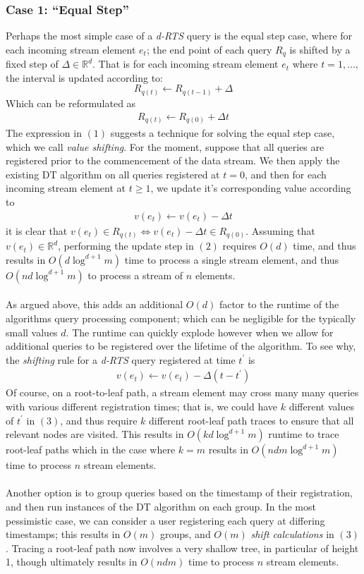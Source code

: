 \subsubsection*{Case 1: ``Equal Step''}
Perhaps the most simple case of a \textit{d-RTS} query is the equal step case, where for each incoming stream element $e_t$; the end point of each query $R_q$ is shifted by a fixed step of $\Delta\in\mathbb{R}^d$. That is for each incoming stream element $e_t$ where $t = 1,\dots,$ the interval is updated according to: 
$$R_{q(t)} \leftarrow R_{q(t-1)} + \Delta$$
Which can be reformulated as 
\begin{align}
    R_{q(t)} \leftarrow R_{q(0)} + \Delta t
\end{align}
The expression in $(1)$ suggests a technique for solving the equal step case, which we call \textit{value shifting}. For the moment, suppose that all queries are registered prior to the commencement of the data stream. We then apply the existing DT algorithm on all queries registered at $t=0$, and then for each incoming stream element at $t\geq1$, we update it's corresponding value according to 
\begin{align}
    v(e_t) \leftarrow v(e_t) - \Delta t
\end{align}
it is clear that $v(e_t) \in R_{q(t)} \iff v(e_t)-\Delta t \in R_{q(0)}$. Assuming that $v(e_t)\in\mathbb{R}^d$, performing the update step in $(2)$ requires $O(d)$ time, and thus results in $O(d\log^{d+1}m)$ time to process a single stream element, and thus $O(nd\log^{d+1}m)$ to process a stream of $n$ elements. \\
\\
As argued above, this adds an additional $O(d)$ factor to the runtime of the algorithms query processing component; which can be negligible for the typically small values $d$. The runtime can quickly explode however when we allow for additional queries to be registered over the lifetime of the algorithm. To see why, the \textit{shifting} rule for a \textit{d-RTS} query registered at time $t^\prime$ is
\begin{align}
    v(e_t) \leftarrow v(e_t) - \Delta(t - t^\prime)
\end{align}
Of course, on a root-to-leaf path, a stream element may cross many many queries with various different registration times; that is, we could have $k$ different values of $t^\prime$ in $(3)$, and thus require $k$ different root-leaf path traces to ensure that all relevant nodes are visited. This results in $O(kd\log^{d+1}m)$ runtime to trace root-leaf paths which in the case where $k=m$ results in $O(ndm\log^{d+1}m)$ time to process $n$ stream elements.\\
\\
Another option is to group queries based on the timestamp of their registration, and then run instances of the DT algorithm on each group. In the most pessimistic case, we can consider a user registering each query at differing timestamps; this results in $O(m)$ groups, and $O(m)$ \textit{shift calculations} in $(3)$. Tracing a root-leaf path now involves a very shallow tree, in particular of height 1, though ultimately results in $O(ndm)$ time to process $n$ stream elements.